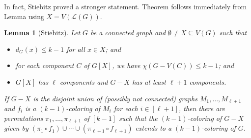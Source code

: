 \documentclass[12pt]{article}
\theoremstyle{plain}
\newtheorem*{Lemma}{Lemma}
\theoremstyle{definition}
\theoremstyle{remark}
\newcommand{\fancy}[1]{\mathcal{#1}}
\renewcommand{\L}{\fancy{L}}
\newcommand{\irange}[1]{\left[#1\right]}
\def\L{\fancy{L}}
\begin{document}
In fact, Stiebitz proved a stronger statement.  Theorem follows immediately from Lemma using $X = V(\L(G))$.
\begin{Lemma}[Stiebitz]
Let $G$ be a connected graph and $\emptyset \ne X \subseteq V(G)$ such that
\begin{itemize}
\item $d_G(x) \le k - 1$ for all $x \in X$; and
\item for each component $C$ of $G[X]$, we have $\chi(G - V(C)) \le k - 1$; and
\item $G[X]$ has $\ell$ components and $G-X$ has at least $\ell + 1$ components.
\end{itemize}
If $G-X$ is the disjoint union of (possibly not connected) graphs $M_1, \ldots, M_{\ell + 1}$ and $f_i$ is a $(k-1)$-coloring of $M_i$ for each $i \in \irange{\ell + 1}$, 
then there are permutations $\pi_1, \ldots, \pi_{\ell + 1}$ of $\irange{k-1}$ such that the $(k-1)$-coloring of $G-X$ given by $(\pi_1 \circ f_1) \cup \cdots \cup (\pi_{\ell + 1} \circ f_{\ell + 1})$ extends to a $(k - 1)$-coloring of $G$.
\end{Lemma}
\end{document}
